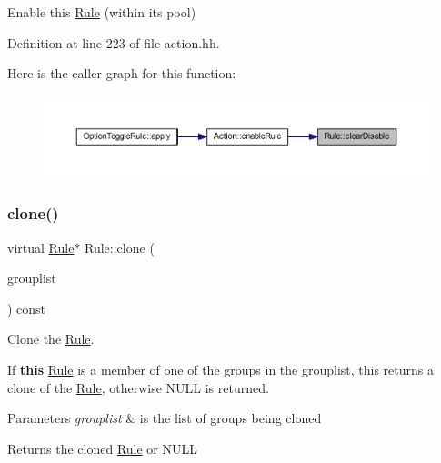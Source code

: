 Enable this \mbox{\hyperlink{class_rule}{Rule}} (within its pool) 



Definition at line 223 of file action.\+hh.

Here is the caller graph for this function\+:
\nopagebreak
\begin{figure}[H]
\begin{center}
\leavevmode
\includegraphics[width=350pt]{class_rule_aa0da83f1d7cb161bbe27f874d520bab6_icgraph}
\end{center}
\end{figure}
\mbox{\label{class_rule_a70de90a76461bfa7ea0b575ce3c11e4d}} 
\subsubsection{\texorpdfstring{clone()}{clone()}}
{\footnotesize\ttfamily virtual \mbox{\hyperlink{class_rule}{Rule}}$\ast$ Rule\+::clone (\begin{DoxyParamCaption}\item[{const \mbox{\hyperlink{class_action_group_list}{Action\+Group\+List}} \&}]{grouplist }\end{DoxyParamCaption}) const\hspace{0.3cm}{\ttfamily [pure virtual]}}



Clone the \mbox{\hyperlink{class_rule}{Rule}}. 

If {\bfseries{this}} \mbox{\hyperlink{class_rule}{Rule}} is a member of one of the groups in the grouplist, this returns a clone of the \mbox{\hyperlink{class_rule}{Rule}}, otherwise N\+U\+LL is returned. 
\begin{DoxyParams}{Parameters}
{\em grouplist} & is the list of groups being cloned \\
\hline
\end{DoxyParams}
\begin{DoxyReturn}{Returns}
the cloned \mbox{\hyperlink{class_rule}{Rule}} or N\+U\+LL 
\end{DoxyReturn}


